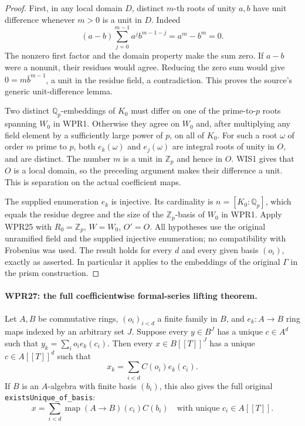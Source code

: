 \documentclass[11pt,a4paper]{article}
\numberwithin{equation}{section}
\theoremstyle{remark}\newtheorem{remark}[theorem]{Remark}
\begin{document}
\begin{proof}
First, in any local domain $D$, distinct $m$-th roots of unity
$a,b$ have unit difference whenever $m>0$ is a unit in $D$.
Indeed
\[
 (a-b)\sum_{j=0}^{m-1}a^j b^{m-1-j}=a^m-b^m=0.
\]
The nonzero first factor and the domain property make the sum
zero. If $a-b$ were a nonunit, their residues would agree.
Reducing the zero sum would give
$0=m\bar b^{m-1}$, a unit in the residue field, a contradiction.
This proves the source's generic unit-difference lemma.

Two distinct $\mathbb Q_p$-embeddings of $K_0$ must differ on
one of the prime-to-$p$ roots spanning $W_0$ in WPR1. Otherwise
they agree on $W_0$ and, after multiplying any field element
by a sufficiently large power of $p$, on all of $K_0$.
For such a root $\omega$ of order $m$ prime to $p$, both
$e_k(\omega)$ and $e_j(\omega)$ are integral roots of unity
in $O$, and are distinct. The number $m$ is a unit in
$\mathbb Z_p$ and hence in $O$. WIS1 gives that $O$ is a
local domain, so the preceding argument makes their difference
a unit. This is separation on the actual coefficient maps.

The supplied enumeration $e_k$ is injective. Its cardinality
is $n=[K_0:\mathbb Q_p]$, which equals the residue degree
and the size of the $\mathbb Z_p$-basis of $W_0$ in WPR1.
Apply WPR25 with $R_0=\mathbb Z_p$, $W=W_0$, $O'=O$.
All hypotheses use the original unramified field and the
supplied injective enumeration; no compatibility with Frobenius
was used. The result holds for every $d$ and every given
basis $(o_i)$, exactly as asserted. In particular it applies
to the embeddings of the original $\Gamma$ in the prism
construction.
\end{proof}

\paragraph{WPR27: the full coefficientwise formal-series lifting theorem.}
\label{claim:WPR27}
Let $A,B$ be commutative rings, $(o_i)_{i<d}$ a finite family
in $B$, and $e_k:A\to B$ ring maps indexed by an arbitrary
set $J$. Suppose every $y\in B^J$ has a unique $c\in A^d$
such that $y_k=\sum_i o_i e_k(c_i)$. Then every
$x\in B[[T]]^J$ has a unique $c\in A[[T]]^d$ such that
\[
                  x_k=\sum_{i<d}C(o_i)e_k(c_i).
 \tag{WPR.32}
\]
If $B$ is an $A$-algebra with finite basis $(b_i)$, this also
gives the full original \texttt{exists\allowbreak Unique\_\allowbreak of\_\allowbreak basis}:
\[
 x=\sum_{i<d}\operatorname{map}(A\to B)(c_i)C(b_i)
 \quad\text{with unique }c_i\in A[[T]].                      \tag{WPR.33}
\]
\end{document}
